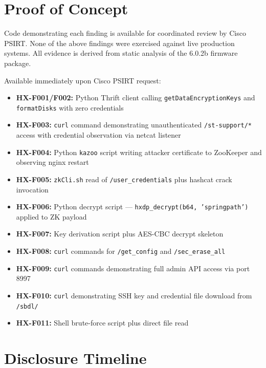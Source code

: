 \documentclass[11pt,a4paper]{article}
\begin{document}
\bigskip

\section*{Proof of Concept}

Code demonstrating each finding is available for coordinated review by Cisco
PSIRT. None of the above findings were exercised against live production systems.
All evidence is derived from static analysis of the 6.0.2b firmware package.

Available immediately upon Cisco PSIRT request:

\begin{itemize}[noitemsep]
\item \textbf{HX-F001/F002:} Python Thrift client calling
  \texttt{getDataEncryptionKeys} and \texttt{formatDisks} with zero
  credentials
\item \textbf{HX-F003:} \texttt{curl} command demonstrating unauthenticated
  \texttt{/st-support/*} access with credential observation via netcat listener
\item \textbf{HX-F004:} Python \texttt{kazoo} script writing attacker
  certificate to ZooKeeper and observing nginx restart
\item \textbf{HX-F005:} \texttt{zkCli.sh} read of \texttt{/user\_credentials}
  plus hashcat crack invocation
\item \textbf{HX-F006:} Python decrypt script --- \texttt{hxdp\_decrypt(b64,
  'springpath')} applied to ZK payload
\item \textbf{HX-F007:} Key derivation script plus AES-CBC decrypt skeleton
\item \textbf{HX-F008:} \texttt{curl} commands for \texttt{/get\_config} and
  \texttt{/sec\_erase\_all}
\item \textbf{HX-F009:} \texttt{curl} commands demonstrating full admin API
  access via port 8997
\item \textbf{HX-F010:} \texttt{curl} demonstrating SSH key and credential
  file download from \texttt{/sbdl/}
\item \textbf{HX-F011:} Shell brute-force script plus direct file read
\end{itemize}

\section*{Disclosure Timeline}
\end{document}
